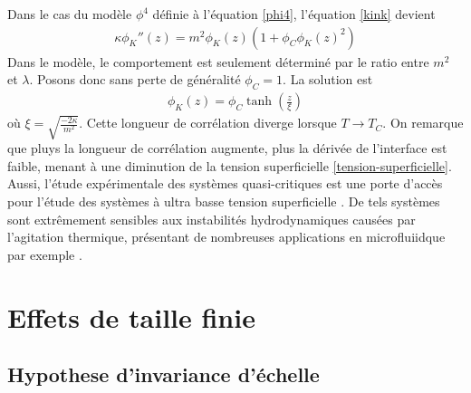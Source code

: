 Dans le cas du modèle $\phi^4$ définie à l'équation \ref{phi4}, l'équation \ref{kink} devient
\begin{align}
    \kappa \phi_K''(z) = m^2 \phi_K(z) \left( 1 + \phi_C \phi_K(z) ^2 \right)
       \label{eq-interface-glauber}
\end{align}
Dans le modèle, le comportement est seulement déterminé par le ratio entre $m^2$ et $\lambda$. Posons donc sans perte de généralité $\phi_C = 1$. La solution est  
\begin{align}
    \phi_K(z) = \phi_C \tanh \left( \frac{z}{\xi} \right)
       \label{profil-interface-glauber}    
\end{align}
où $\xi = \sqrt{\frac{-2 \kappa}{m^2}}$. Cette longueur de corrélation diverge lorsque $T \to T_C$. On remarque que pluys la longueur de corrélation augmente, plus la dérivée de l'interface est faible, menant à une diminution de la tension superficielle \ref{tension-superficielle}. Aussi, l'étude expérimentale des systèmes quasi-critiques est une porte d'accès pour l'étude des systèmes à ultra basse tension superficielle \cite{hennequin_drop_2006}. De tels systèmes sont extrêmement sensibles aux instabilités hydrodynamiques causées par l'agitation thermique, présentant de nombreuses applications en microfluiidque par exemple \cite{atencia_controlled_2005}. 

    \section{Effets de taille finie}
    \label{sec-casimir}    

    \subsection{Hypothese d'invariance d'échelle}

